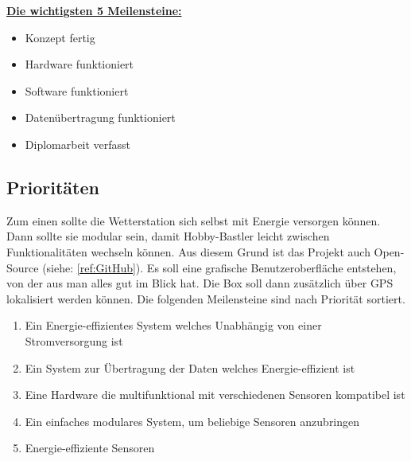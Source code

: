     \underline{\textbf{Die wichtigsten 5 Meilensteine: }}
    \begin{itemize}
        \item Konzept fertig
        \item Hardware funktioniert
        \item Software funktioniert
        \item Datenübertragung funktioniert 
        \item Diplomarbeit verfasst 
    \end{itemize}
    
    \subsection{Prioritäten}
    Zum einen sollte die Wetterstation sich selbst mit Energie versorgen können. Dann sollte sie modular sein, damit Hobby-Bastler leicht zwischen Funktionalitäten wechseln können. Aus diesem Grund ist das Projekt auch Open-Source (siehe: \ref{ref:GitHub}). Es soll eine grafische Benutzeroberfläche entstehen, von der aus man alles gut im Blick hat. Die Box soll dann zusätzlich über GPS lokalisiert werden können.
    Die folgenden Meilensteine sind nach Priorität sortiert.
    
    \begin{enumerate}
        \item Ein Energie-effizientes System welches Unabhängig von einer Stromversorgung ist
        \item Ein System zur Übertragung der Daten welches Energie-effizient ist
        \item Eine Hardware die multifunktional mit verschiedenen Sensoren kompatibel ist
        \item Ein einfaches modulares System, um beliebige Sensoren anzubringen 
        \item Energie-effiziente Sensoren
    \end{enumerate}
